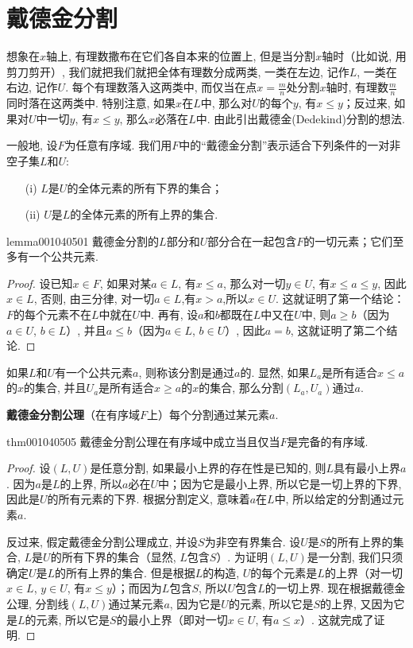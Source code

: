\section{戴德金分割}\label{section0010405}
想象在$x$轴上, 有理数撒布在它们各自本来的位置上, 但是当分割$x$轴时（比如说, 用剪刀剪开）, 我们就把我们就把全体有理数分成两类, 一类在左边, 记作$L$, 一类在右边, 记作$U$. 每个有理数落入这两类中, 而仅当在点$x = \frac{m}{n}$处分割$x$轴时, 有理数$\frac{m}{n}$同时落在这两类中. 特别注意, 如果$x$在$L$中, 那么对$U$的每个$y$, 有$x \le y$；反过来, 如果对$U$中一切$y$, 有$x \le y$, 那么$x$必落在$L$中. 由此引出戴德金(Dedekind)分割的想法.  

一般地, 设$F$为任意有序域. 我们用$F$中的“戴德金分割”表示适合下列条件的一对非空子集$L$和$U$:
\begin{enumerate}
\item[(i)]$L$是$U$的全体元素的所有下界的集合；
\item[(ii)]$U$是$L$的全体元素的所有上界的集合. 
\end{enumerate}

\begin{lemma}{}{lemma001040501}
戴德金分割的$L$部分和$U$部分合在一起包含$F$的一切元素；它们至多有一个公共元素. 
\end{lemma}

\begin{proof}
设已知$x \in F$, 如果对某$a \in L$, 有$x \le a$, 那么对一切$y \in U$, 有$x \le a \le y$, 因此$x \in L$, 否则, 由三分律, 对一切$a \in L$,有$x > a$,所以$x \in U$. 这就证明了第一个结论：$F$的每个元素不在$L$中就在$U$中. 再有, 设$a$和$b$都既在$L$中又在$U$中, 则$a \ge b$（因为$a \in U$, $b \in L$）, 并且$a \le b$（因为$a \in L$, $b \in U$）, 因此$a=b$, 这就证明了第二个结论. 
\end{proof}

如果$L$和$U$有一个公共元素$a$, 则称该分割是通过$a$的. 显然, 如果$L_a$是所有适合$x \le a$的$x$的集合, 并且$U_a$是所有适合$x\ge a$的$x$的集合, 那么分割$(L_a, U_a)$通过$a$.

\textbf{戴德金分割公理}\quad （在有序域$F$上）每个分割通过某元素$a$.

\begin{theorem}{}{thm001040505}
戴德金分割公理在有序域中成立当且仅当$F$是完备的有序域. 
\end{theorem}

\begin{proof}
设$(L, U)$是任意分割, 如果最小上界的存在性是已知的, 则$L$具有最小上界$a$. 因为$a$是$L$的上界, 所以$a$必在$U$中；因为它是最小上界, 所以它是一切上界的下界, 因此是$U$的所有元素的下界. 根据分割定义, 意味着$a$在$L$中, 所以给定的分割通过元素$a$.

反过来, 假定戴德金分割公理成立, 并设$S$为非空有界集合. 设$U$是$S$的所有上界的集合, $L$是$U$的所有下界的集合（显然, $L$包含$S$）. 为证明$(L,U)$是一分割, 我们只须确定$U$是$L$的所有上界的集合. 但是根据$L$的构造, $U$的每个元素是$L$的上界（对一切$x \in L$, $y \in U$, 有$x \le y$）；而因为$L$包含$S$, 所以$U$包含$L$的一切上界. 现在根据戴德金公理, 分割线$(L,U)$通过某元素$a$, 因为它是$U$的元素, 所以它是$S$的上界, 又因为它是$L$的元素, 所以它是$S$的最小上界（即对一切$x \in U$, 有$a \le x$）. 这就完成了证明. 
\end{proof}

